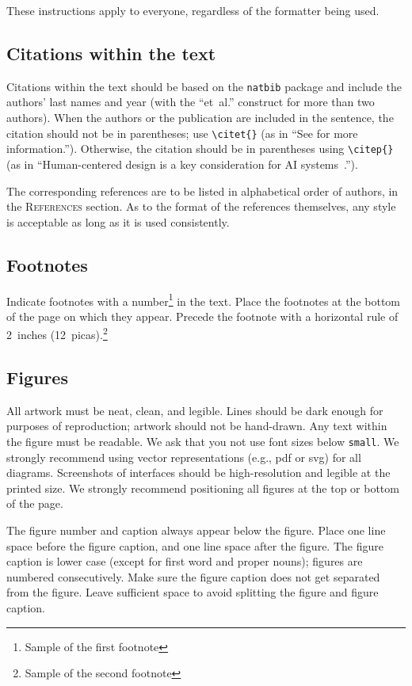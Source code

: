 \documentclass{article} %
\begin{document}
These instructions apply to everyone, regardless of the formatter being used.

\subsection{Citations within the text}

Citations within the text should be based on the \texttt{natbib} package
and include the authors' last names and year (with the ``et~al.'' construct
for more than two authors). When the authors or the publication are
included in the sentence, the citation should not be in parentheses; use
\verb|\citet{}| (as in ``See \citet{exampleHCI} for more information.'').
Otherwise, the citation should be in parentheses using \verb|\citep{}| (as in
``Human-centered design is a key consideration for AI
systems~\citep{exampleAI}.'').

The corresponding references are to be listed in alphabetical order of
authors, in the \textsc{References} section. As to the format of the
references themselves, any style is acceptable as long as it is used
consistently.

\subsection{Footnotes}

Indicate footnotes with a number\footnote{Sample of the first footnote} in the
text. Place the footnotes at the bottom of the page on which they appear.
Precede the footnote with a horizontal rule of 2~inches
(12~picas).\footnote{Sample of the second footnote}

\subsection{Figures}

All artwork must be neat, clean, and legible. Lines should be dark
enough for purposes of reproduction; artwork should not be
hand-drawn. Any text within the figure must be readable. We ask that you not
use font sizes below {\tt small}. We strongly recommend using vector
representations (e.g., pdf or svg) for all diagrams. Screenshots of interfaces
should be high-resolution and legible at the printed size.
We strongly recommend positioning all figures at the top or bottom of the page.

The figure number and caption always appear below the figure. Place one line
space before the figure caption, and one line space after the figure. The
figure caption is lower case (except for first word and proper nouns); figures
are numbered consecutively.
Make sure the figure caption does not get separated from the figure.
Leave sufficient space to avoid splitting the figure and figure caption.
\end{document}
